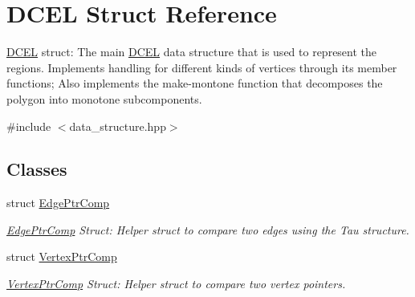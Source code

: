 \hypertarget{structDCEL}{}\section{D\+C\+EL Struct Reference}
\label{structDCEL}


\hyperlink{structDCEL}{D\+C\+EL} struct\+: The main \hyperlink{structDCEL}{D\+C\+EL} data structure that is used to represent the regions. Implements handling for different kinds of vertices through its member functions; Also implements the make-\/montone function that decomposes the polygon into monotone subcomponents.  




{\ttfamily \#include $<$data\+\_\+structure.\+hpp$>$}

\subsection*{Classes}
\begin{DoxyCompactItemize}
\item 
struct \hyperlink{structDCEL_1_1EdgePtrComp}{Edge\+Ptr\+Comp}
\begin{DoxyCompactList}\small\item\em \hyperlink{structDCEL_1_1EdgePtrComp}{Edge\+Ptr\+Comp} Struct\+: Helper struct to compare two edges using the Tau structure. \end{DoxyCompactList}\item 
struct \hyperlink{structDCEL_1_1VertexPtrComp}{Vertex\+Ptr\+Comp}
\begin{DoxyCompactList}\small\item\em \hyperlink{structDCEL_1_1VertexPtrComp}{Vertex\+Ptr\+Comp} Struct\+: Helper struct to compare two vertex pointers. \end{DoxyCompactList}\end{DoxyCompactItemize}

